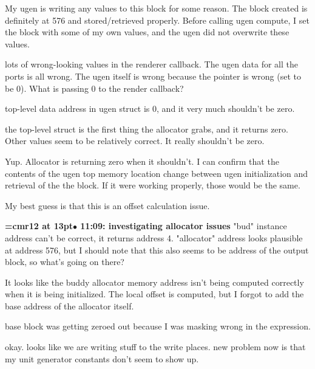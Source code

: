 My ugen is writing any values to this block for some reason. The block created is definitely at 576 and stored/retrieved properly. Before calling ugen compute, I set the block with some of my own values, and the ugen did not overwrite these values.
\par

lots of wrong-looking values in the renderer callback. The ugen data for all the ports is all wrong. The ugen itself is wrong because the pointer is wrong (set to be 0). What is passing 0 to the render callback?
\par

top-level data address in ugen struct is 0, and it very much shouldn't be zero.
\par

the top-level struct is the first thing the allocator grabs, and it returns zero. Other values seem to be relatively correct. It really shouldn't be zero.
\par

Yup. Allocator is returning zero when it shouldn't. I can confirm that the contents of the ugen top memory location change between ugen initialization and retrieval of the the block. If it were working properly, those would be the same.
\par

My best guess is that this is an offset calculation issue.
\par

{\smallskip\noindent\bf\font\titlefont=cmr12 at 13pt\titlefont $\bullet$ 11:09: investigating allocator issues}\smallskip
"bud" instance address can't be correct, it returns address 4. "allocator" address looks plausible at address 576, but I should note that this also seems to be address of the output block, so what's going on there?
\par

It looks like the buddy allocator memory address isn't being computed correctly when it is being initialized. The local offset is computed, but I forgot to add the base address of the allocator itself.
\par

base block was getting zeroed out because I was masking wrong in the expression.
\par

okay. looks like we are writing stuff to the write places. new problem now is that my unit generator constants don't seem to show up.
\par

